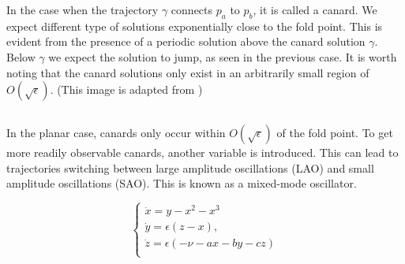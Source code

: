 \documentclass[14pt, a0paper, portrait]{tikzposter}
\begin{document}
\begin{columns}
{\begin{minipage}{0.5\linewidth}
    In the case when the trajectory $\gamma$ connects $p_a$ to $p_b$, it is called a canard. We expect different type of solutions exponentially close to the fold point. This is evident from the presence of a periodic solution above the canard solution $\gamma$. Below $\gamma$ we expect the solution to jump, as seen in the previous case. It is worth noting that the canard solutions only exist in an arbitrarily small region of $O(\sqrt{\epsilon})$. (This image is adapted from \cite{krupa2001})\end{minipage}}
\end{columns}




{	In the planar case, canards only occur within $O(\sqrt{\epsilon})$ of the fold point. To get more readily observable canards, another variable is introduced. This can lead to trajectories switching between large amplitude oscillations (LAO) and small amplitude oscillations (SAO). This is known as a mixed-mode oscillator.
	
	$$\begin{cases} \dot{x} = y-x^2-x^3\\ \dot{y} = \epsilon(z-x),\\ \dot{z}= \epsilon(-\nu-ax-by-cz)\\ \end{cases}$$
}
\end{document}
